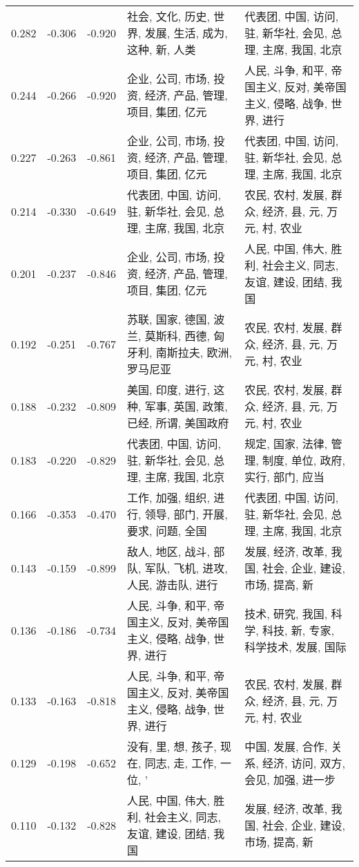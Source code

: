 \begin{tabular}{cccp{5cm}p{5cm}}
0.282 & -0.306 & -0.920 & 社会, 文化, 历史, 世界, 发展, 生活, 成为, 这种, 新, 人类 & 代表团, 中国, 访问, 驻, 新华社, 会见, 总理, 主席, 我国, 北京 \\
0.244 & -0.266 & -0.920 & 企业, 公司, 市场, 投资, 经济, 产品, 管理, 项目, 集团, 亿元 & 人民, 斗争, 和平, 帝国主义, 反对, 美帝国主义, 侵略, 战争, 世界, 进行 \\
0.227 & -0.263 & -0.861 & 企业, 公司, 市场, 投资, 经济, 产品, 管理, 项目, 集团, 亿元 & 代表团, 中国, 访问, 驻, 新华社, 会见, 总理, 主席, 我国, 北京 \\
0.214 & -0.330 & -0.649 & 代表团, 中国, 访问, 驻, 新华社, 会见, 总理, 主席, 我国, 北京 & 农民, 农村, 发展, 群众, 经济, 县, 元, 万元, 村, 农业 \\
0.201 & -0.237 & -0.846 & 企业, 公司, 市场, 投资, 经济, 产品, 管理, 项目, 集团, 亿元 & 人民, 中国, 伟大, 胜利, 社会主义, 同志, 友谊, 建设, 团结, 我国 \\
0.192 & -0.251 & -0.767 & 苏联, 国家, 德国, 波兰, 莫斯科, 西德, 匈牙利, 南斯拉夫, 欧洲, 罗马尼亚 & 农民, 农村, 发展, 群众, 经济, 县, 元, 万元, 村, 农业 \\
0.188 & -0.232 & -0.809 & 美国, 印度, 进行, 这种, 军事, 英国, 政策, 已经, 所谓, 美国政府 & 农民, 农村, 发展, 群众, 经济, 县, 元, 万元, 村, 农业 \\
0.183 & -0.220 & -0.829 & 代表团, 中国, 访问, 驻, 新华社, 会见, 总理, 主席, 我国, 北京 & 规定, 国家, 法律, 管理, 制度, 单位, 政府, 实行, 部门, 应当 \\
0.166 & -0.353 & -0.470 & 工作, 加强, 组织, 进行, 领导, 部门, 开展, 要求, 问题, 全国 & 代表团, 中国, 访问, 驻, 新华社, 会见, 总理, 主席, 我国, 北京 \\
0.143 & -0.159 & -0.899 & 敌人, 地区, 战斗, 部队, 军队, 飞机, 进攻, 人民, 游击队, 进行 & 发展, 经济, 改革, 我国, 社会, 企业, 建设, 市场, 提高, 新 \\
0.136 & -0.186 & -0.734 & 人民, 斗争, 和平, 帝国主义, 反对, 美帝国主义, 侵略, 战争, 世界, 进行 & 技术, 研究, 我国, 科学, 科技, 新, 专家, 科学技术, 发展, 国际 \\
0.133 & -0.163 & -0.818 & 人民, 斗争, 和平, 帝国主义, 反对, 美帝国主义, 侵略, 战争, 世界, 进行 & 农民, 农村, 发展, 群众, 经济, 县, 元, 万元, 村, 农业 \\
0.129 & -0.198 & -0.652 & 没有, 里, 想, 孩子, 现在, 同志, 走, 工作, 一位, ’ & 中国, 发展, 合作, 关系, 经济, 访问, 双方, 会见, 加强, 进一步 \\
0.110 & -0.132 & -0.828 & 人民, 中国, 伟大, 胜利, 社会主义, 同志, 友谊, 建设, 团结, 我国 & 发展, 经济, 改革, 我国, 社会, 企业, 建设, 市场, 提高, 新 \\

\end{tabular}
